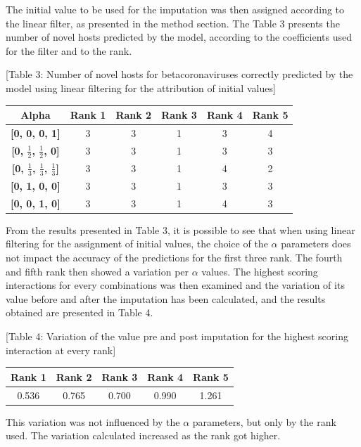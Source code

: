 \documentclass[11pt]{article}
\begin{document}
The initial value to be used for the imputation was then assigned
according to the linear filter, as presented in the method section. The
Table 3 presents the number of novel hosts predicted by the model,
according to the coefficients used for the filter and to the rank.

{[}Table 3: Number of novel hosts for betacoronaviruses correctly
predicted by the model using linear filtering for the attribution of
initial values{]}

\begin{longtable}[]{@{}cccccc@{}}
\toprule
Alpha & Rank 1 & Rank 2 & Rank 3 & Rank 4 & Rank 5\tabularnewline
\midrule
\endhead
\textbf{{[}0, 0, 0, 1{]}} & 3 & 3 & 1 & 3 & 4\tabularnewline
\textbf{{[}0, \(\frac{1}{2}\), \(\frac{1}{2}\), 0{]}} & 3 & 3 & 1 & 3 &
3\tabularnewline
\textbf{{[}0, \(\frac{1}{3}\), \(\frac{1}{3}\), \(\frac{1}{3}\){]}} & 3
& 3 & 1 & 4 & 2\tabularnewline
\textbf{{[}0, 1, 0, 0{]}} & 3 & 3 & 1 & 3 & 3\tabularnewline
\textbf{{[}0, 0, 1, 0{]}} & 3 & 3 & 1 & 4 & 3\tabularnewline
\bottomrule
\end{longtable}

From the results presented in Table 3, it is possible to see that when
using linear filtering for the assignment of initial values, the choice
of the \(\alpha\) parameters does not impact the accuracy of the
predictions for the first three rank. The fourth and fifth rank then
showed a variation per \(\alpha\) values. The highest scoring
interactions for every combinations was then examined and the variation
of its value before and after the imputation has been calculated, and
the results obtained are presented in Table 4.

{[}Table 4: Variation of the value pre and post imputation for the
highest scoring interaction at every rank{]}

\begin{longtable}[]{@{}ccccc@{}}
\toprule
Rank 1 & Rank 2 & Rank 3 & Rank 4 & Rank 5\tabularnewline
\midrule
\endhead
0.536 & 0.765 & 0.700 & 0.990 & 1.261\tabularnewline
\bottomrule
\end{longtable}

This variation was not influenced by the \(\alpha\) parameters, but only
by the rank used. The variation calculated increased as the rank got
higher.
\end{document}

